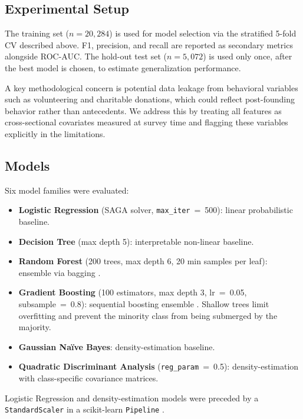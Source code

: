 \documentclass[10pt,twocolumn]{article}
\newenvironment{compactitem}{%
  \begin{itemize}%
  \setlength{\itemsep}{1pt}\setlength{\parskip}{0pt}\setlength{\parsep}{0pt}%
}{\end{itemize}}
\begin{document}
\subsection{Experimental Setup}

The training set ($n = 20{,}284$) is used for model selection via the
stratified 5-fold CV described above. F1, precision, and recall are reported as
secondary metrics alongside ROC-AUC. The hold-out test set ($n = 5{,}072$) is
used only once, after the best model is chosen, to estimate generalization
performance.

A key methodological concern is potential data leakage from behavioral variables
such as volunteering and charitable donations, which could reflect post-founding
behavior rather than antecedents. We address this by treating all features as
cross-sectional covariates measured at survey time and flagging these variables
explicitly in the limitations.

\subsection{Models}

Six model families were evaluated:

\begin{compactitem}
  \item \textbf{Logistic Regression} (SAGA solver, \texttt{max\_iter}~=~500):
  linear probabilistic baseline.
  \item \textbf{Decision Tree} (max depth 5): interpretable non-linear
  baseline.
  \item \textbf{Random Forest} (200 trees, max depth 6, 20 min samples per
  leaf): ensemble via bagging \cite{breiman2001}.
  \item \textbf{Gradient Boosting} (100 estimators, max depth 3,
  lr~=~0.05, subsample~=~0.8): sequential boosting ensemble \cite{friedman2001}.
  Shallow trees limit overfitting and prevent the minority class from being
  submerged by the majority.
  \item \textbf{Gaussian Naïve Bayes}: density-estimation baseline.
  \item \textbf{Quadratic Discriminant Analysis} (\texttt{reg\_param}~=~0.5):
  density-estimation with class-specific covariance matrices.
\end{compactitem}

Logistic Regression and density-estimation models were preceded by a
\texttt{StandardScaler} in a scikit-learn \texttt{Pipeline} \cite{senger2025}.
\end{document}
